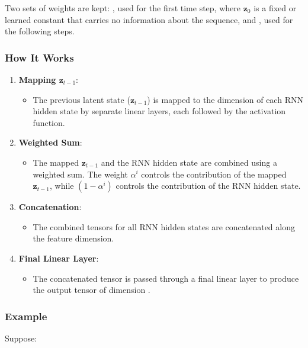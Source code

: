 Two sets of weights are kept: , used for the first
time step, where $\bm{z}_{0}$ is a fixed or learned constant that carries
no information about the sequence, and , used for the
following steps.

\subsubsection*{How It Works}
\begin{enumerate}
    \item \textbf{Mapping $\bm{z}_{t-1}$}:
        \begin{itemize}
            \item The previous latent state ($\bm{z}_{t-1}$) is mapped to
            the dimension of each RNN hidden state by separate linear
            layers, each followed by the activation function.
        \end{itemize}
    \item \textbf{Weighted Sum}:
        \begin{itemize}
            \item The mapped $\bm{z}_{t-1}$ and the RNN hidden state are 
            combined using a weighted sum. The weight $\alpha^i$ 
            controls the contribution of the mapped $\bm{z}_{t-1}$, while 
            $(1 - \alpha^i)$ controls the contribution of the RNN hidden 
            state.
        \end{itemize}
    \item \textbf{Concatenation}:
        \begin{itemize}
            \item The combined tensors for all RNN hidden states are 
            concatenated along the feature dimension.
        \end{itemize}
    \item \textbf{Final Linear Layer}:
        \begin{itemize}
            \item The concatenated tensor is passed through a final linear
            layer to produce the output tensor of dimension .
        \end{itemize}
\end{enumerate}

\subsubsection*{Example}
Suppose:

